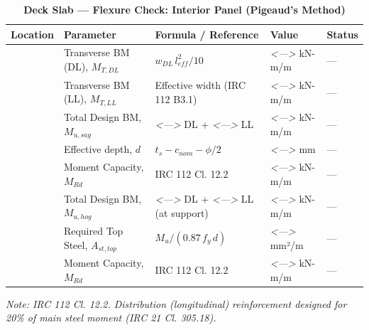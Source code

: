 \documentclass[12pt,a4paper]{report}
\numberwithin{table}{chapter}
\numberwithin{figure}{chapter}
\newcommand{\placeholder}[1]{\textit{\textless #1\textgreater}}
\begin{document}
\vspace{1em}
\begin{longtable}{|C{3.0cm}|C{3.5cm}|C{3.0cm}|>{\centering\arraybackslash}p{4.2cm}|C{1.8cm}|}
\caption{\textbf{Deck Slab --- Flexure Check: Interior Panel (Pigeaud's Method)}} \\
\hline
\textbf{Location} & \textbf{Parameter} & \textbf{Formula / Reference} & \textbf{Value} & \textbf{Status} \\[6pt]
\hline
{} & Transverse BM (DL), $M_{T,DL}$ & $w_{DL}\,l_{eff}^2/10$ & \placeholder{---} kN-m/m & --- \\[6pt]
 & Transverse BM (LL), $M_{T,LL}$ & Effective width (IRC 112 B3.1) & \placeholder{---} kN-m/m & --- \\[6pt]
 & Total Design BM, $M_{u,sag}$ & \placeholder{---} DL + \placeholder{---} LL & \placeholder{---} kN-m/m & --- \\[6pt]
 & Effective depth, $d$ & $t_s - c_{nom} - \phi/2$ & \placeholder{---} mm & --- \\[6pt]
 & Moment Capacity, $M_{Rd}$ & IRC 112 Cl. 12.2 & \placeholder{---} kN-m/m & --- \\[6pt]
\hline
{} & Total Design BM, $M_{u,hog}$ & \placeholder{---} DL + \placeholder{---} LL (at support) & \placeholder{---} kN-m/m & --- \\[6pt]
 & Required Top Steel, $A_{st,top}$ & $M_u / (0.87\,f_y\,d)$ & \placeholder{---} mm²/m & --- \\[6pt]
 & Moment Capacity, $M_{Rd}$ & IRC 112 Cl. 12.2 & \placeholder{---} kN-m/m & --- \\[6pt]
\hline
\end{longtable}
\noindent\textit{Note: IRC 112 Cl. 12.2. Distribution (longitudinal) reinforcement designed for 20\% of main steel moment (IRC 21 Cl. 305.18).}
\end{document}

